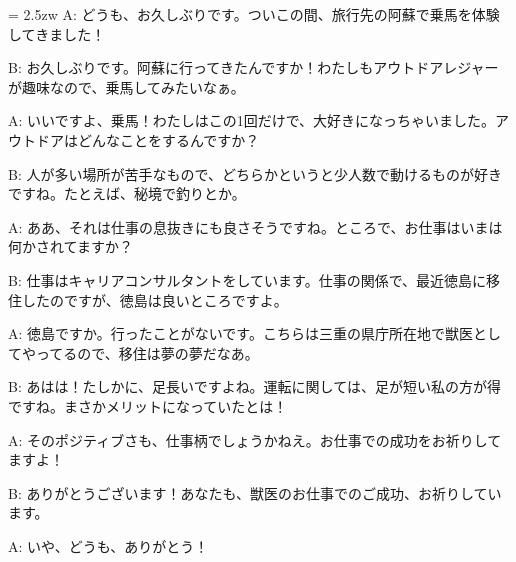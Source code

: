 \documentclass[11pt]{amsart}
\title{}
\author{}
\newenvironment{hangall}[1]{\hangindent = 2.5zw\everypar{\hangindent = 2.5zw}}{}
\begin{document}
\maketitle
\begin{hangall}{}%
A: どうも、お久しぶりです。ついこの間、旅行先の阿蘇で乗馬を体験してきました！



B: お久しぶりです。阿蘇に行ってきたんですか！わたしもアウトドアレジャーが趣味なので、乗馬してみたいなぁ。



A: いいですよ、乗馬！わたしはこの1回だけで、大好きになっちゃいました。アウトドアはどんなことをするんですか？



B: 人が多い場所が苦手なもので、どちらかというと少人数で動けるものが好きですね。たとえば、秘境で釣りとか。



A: ああ、それは仕事の息抜きにも良さそうですね。ところで、お仕事はいまは何かされてますか？



B: 仕事はキャリアコンサルタントをしています。仕事の関係で、最近徳島に移住したのですが、徳島は良いところですよ。



A: 徳島ですか。行ったことがないです。こちらは三重の県庁所在地で獣医としてやってるので、移住は夢の夢だなあ。



B: あはは！たしかに、足長いですよね。運転に関しては、足が短い私の方が得ですね。まさかメリットになっていたとは！



A: そのポジティブさも、仕事柄でしょうかねえ。お仕事での成功をお祈りしてますよ！



B: ありがとうございます！あなたも、獣医のお仕事でのご成功、お祈りしています。



A: いや、どうも、ありがとう！\end{hangall}
\end{document}
